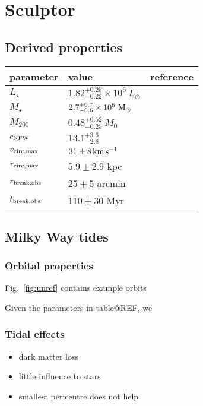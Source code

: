 \section{Sculptor}\label{sculptor}

\subsection{Derived properties}\label{derived-properties}

\begin{table*}[t]
\centering
\begin{tabular}{lll}
\toprule
parameter & value & reference\\
\midrule
$L_\star$ & $1.82_{-0.22}^{+0.25}\times10^6\ L_\odot$ & \\
$M_\star$ & $2.7_{-0.6}^{+0.7} \times10^6\ {\rm M}_\odot$ & \\
$M_{200}$ & $0.48_{-0.25}^{+0.52}\ M_0$ & \\
$c_{\rm NFW}$ & $13.1_{-2.8}^{+3.6}$ & \\
$v_{\rm circ, max}$ & $31\pm8\,{\rm km\,s^{-1}}$ & \\
$r_{\rm circ, max}$ & $5.9 \pm 2.9$ kpc & \\
$r_{\rm break, obs}$ & $25 \pm 5$ arcmin & \\
$t_{\rm break, obs}$ & $110\pm30$ Myr & \\
\bottomrule
\end{tabular}
\end{table*}

\subsection{Milky Way tides}\label{milky-way-tides}

\subsubsection{Orbital properties}\label{orbital-properties}

Fig.~\ref{fig:unref} contains example orbits

Given the parameters in table@REF, we

\subsubsection{Tidal effects}\label{tidal-effects}

\begin{itemize}
\tightlist
\item
  dark matter loss
\item
  little influence to stars
\item
  smallest pericentre does not help
\end{itemize}

